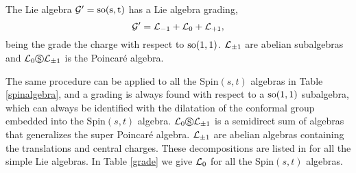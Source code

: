 \documentclass[a4paper,12pt]{article}
\begin{document}
 The Lie algebra $\mathcal{G}'=\rm{so}(s,t)$ has a Lie algebra grading,
$$\mathcal{G}'=\mathcal{L}_{-1}+\mathcal{L}_0+\mathcal{L}_{+1},$$
 being the grade the charge with respect to $\rm{so}(1,1)$.
 $\mathcal{L}_{\pm 1}$ are abelian subalgebras and $\mathcal{L}_{0} \circledS\mathcal{L}_{\pm
 1}$ is the Poincar\'e algebra.

 The same procedure can be applied to all the Spin$(s,t)$ algebras
 in  Table \ref{spinalgebra}, and a grading is always found with respect
 to a $\rm{so}(1,1)$ subalgebra, which can always be identified
 with the dilatation of the conformal group embedded into the
 Spin$(s,t)$ algebra. $\mathcal{L}_0\circledS\mathcal{L}_{\pm
 1}$ is a semidirect sum of algebras that generalizes the super Poincar\'e
 algebra. $\mathcal{L}_{\pm 1}$ are abelian algebras containing the translations and central charges.
  These decompositions are listed in \cite{gi}
 for all the simple Lie algebras. In Table \ref{grade} we give
 $\mathcal{L}_0$ for all the Spin$(s,t)$ algebras.
\end{document}
